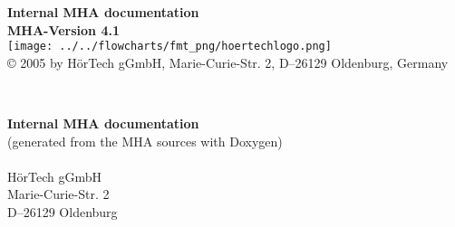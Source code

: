 \documentclass[a4paper]{book}
\begin{document}
\begin{titlepage}
\vspace*{2cm}
\begin{center}
{\Huge\bf Internal MHA documentation\\[1ex]\large MHA-Version 4.1 }\\
\vfill
{\texttt{[image: ../../flowcharts/fmt\_png/hoertechlogo.png]}}\\
\vspace*{0.5cm}
{\small \copyright{} 2005 by H\"orTech gGmbH, Marie-Curie-Str. 2,
  D--26129 Oldenburg, Germany}\\
\end{center}
\end{titlepage}
\thispagestyle{empty}
~

\vfill

{\bf Internal MHA documentation}\\
(generated from the MHA sources with Doxygen)\\
\\
H\"orTech gGmbH\\
Marie-Curie-Str. 2\\
D--26129 Oldenburg
\newpage
{}
\tableofcontents
\newpage
{}
\end{document}
